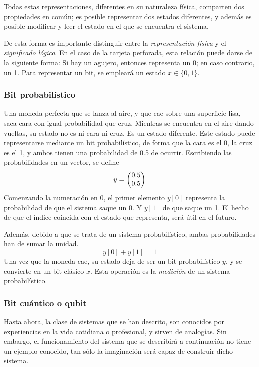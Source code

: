 Todas estas representaciones, diferentes en su naturaleza física, comparten dos 
propiedades en común; es posible representar dos estados diferentes, y además es 
posible modificar y leer el estado en el que se encuentra el sistema.

De esta forma es importante distinguir entre la \textit{representación física} y 
el \textit{significado lógico}. En el caso de la tarjeta perforada, esta 
relación puede darse de la siguiente forma: Si hay un agujero, entonces 
representa un 0; en caso contrario, un 1. Para representar un bit, se empleará 
un estado $x \in \{0, 1\}$.


\subsubsection{Bit probabilístico}

Una moneda perfecta que se lanza al aire, y que cae sobre una superficie lisa, 
saca cara con igual probabilidad que cruz. Mientras se encuentra en el aire 
dando vueltas, su estado no es ni cara ni cruz. Es un estado diferente. Este 
estado puede representarse mediante un bit probabilístico, de forma que la cara 
es el 0, la cruz es el 1, y ambos tienen una probabilidad de 0.5 de ocurrir.  
Escribiendo las probabilidades en un vector, se define
%
$$ y = \begin{pmatrix} 0.5 \\ 0.5 \end{pmatrix} $$
%
Comenzando la numeración en 0, el primer elemento $y[0]$ representa la 
probabilidad de que el sistema saque un 0. Y $y[1]$ de que saque un 1. El hecho 
de que el índice coincida con el estado que representa, será útil en el futuro.

Además, debido a que se trata de un sistema probabilístico, ambas probabilidades 
han de sumar la unidad.
%
$$ y[0] + y[1] = 1 $$
%
Una vez que la moneda cae, su estado deja de ser un bit probabilístico $y$, y se 
convierte en un bit clásico $x$. Esta operación es la \textit{medición} de un 
sistema probabilístico.

\subsubsection{Bit cuántico o qubit}

Hasta ahora, la clase de sistemas que se han descrito, son conocidos por 
experiencias en la vida cotidiana o profesional, y sirven de analogías. Sin 
embargo, el funcionamiento del sistema que se describirá a continuación no tiene 
un ejemplo conocido, tan sólo la imaginación será capaz de construir dicho 
sistema.


